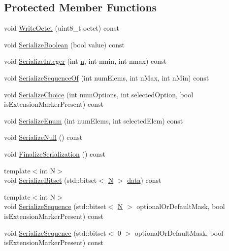 \subsection*{Protected Member Functions}
\begin{DoxyCompactItemize}
\item 
void \hyperlink{classns3_1_1Asn1Header_ae4514f79e0370ceb678de99b4a6a59f0}{Write\+Octet} (uint8\+\_\+t octet) const 
\item 
void \hyperlink{classns3_1_1Asn1Header_a28e3626acdffec71c0376f4f3e7e7ec4}{Serialize\+Boolean} (bool value) const 
\item 
void \hyperlink{classns3_1_1Asn1Header_ab1c3bd37730affa7473bc759d625c29a}{Serialize\+Integer} (int \hyperlink{lte__link__budget__x2__handover__measures_8m_abdb05bc5a064cf642a06c83b3392f148}{n}, int nmin, int nmax) const 
\item 
void \hyperlink{classns3_1_1Asn1Header_a066b6dd077bde6b0c243f3eda2621277}{Serialize\+Sequence\+Of} (int num\+Elems, int n\+Max, int n\+Min) const 
\item 
void \hyperlink{classns3_1_1Asn1Header_a400ef4a710499da80fc55e23a973d4fa}{Serialize\+Choice} (int num\+Options, int selected\+Option, bool is\+Extension\+Marker\+Present) const 
\item 
void \hyperlink{classns3_1_1Asn1Header_ac8e56956823ab8e4470c09e162e7bf24}{Serialize\+Enum} (int num\+Elems, int selected\+Elem) const 
\item 
void \hyperlink{classns3_1_1Asn1Header_ad1814fa357d2148457d7e4ade1ab84a8}{Serialize\+Null} () const 
\item 
void \hyperlink{classns3_1_1Asn1Header_a6c9bfaa54e5ca1a4eb8ea6c6b5550a8b}{Finalize\+Serialization} () const 
\item 
{\footnotesize template$<$int N$>$ }\\void \hyperlink{classns3_1_1Asn1Header_aaaefdfa2dc7c4c1b7b0e13785198bec0}{Serialize\+Bitset} (std\+::bitset$<$ \hyperlink{loss__ITU1238_8m_aaa6c78b1d659f53598dbe891c1139b3e}{N} $>$ \hyperlink{topology-example-sim_8cc_a26c65296e316af77b787dc77469bb2a4}{data}) const 
\item 
{\footnotesize template$<$int N$>$ }\\void \hyperlink{classns3_1_1Asn1Header_aa9744858380443ed95836fed08799aed}{Serialize\+Sequence} (std\+::bitset$<$ \hyperlink{loss__ITU1238_8m_aaa6c78b1d659f53598dbe891c1139b3e}{N} $>$ optional\+Or\+Default\+Mask, bool is\+Extension\+Marker\+Present) const 
\item 
void \hyperlink{classns3_1_1Asn1Header_a426e9789c49f1fe75355e17cd0856723}{Serialize\+Sequence} (std\+::bitset$<$ 0 $>$ optional\+Or\+Default\+Mask, bool is\+Extension\+Marker\+Present) const 

\end{DoxyCompactItemize}

